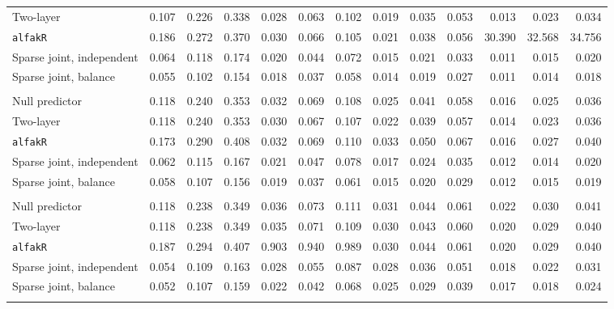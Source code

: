 \begin{center}
\begin{tabular}{l*{12}{r}}
\quad Two-layer & 0.107 & 0.226 & 0.338 & 0.028 & 0.063 & 0.102 & 0.019 & 0.035 & 0.053 & 0.013 & 0.023 & 0.034 \\
\quad \texttt{alfakR} & 0.186 & 0.272 & 0.370 & 0.030 & 0.066 & 0.105 & 0.021 & 0.038 & 0.056 & 30.390 & 32.568 & 34.756 \\
\quad Sparse joint, independent & 0.064 & 0.118 & 0.174 & 0.020 & 0.044 & 0.072 & 0.015 & 0.021 & 0.033 & 0.011 & 0.015 & 0.020 \\
\quad Sparse joint, balance & 0.055 & 0.102 & 0.154 & 0.018 & 0.037 & 0.058 & 0.014 & 0.019 & 0.027 & 0.011 & 0.014 & 0.018 \\
\addlinespace[2pt]
\multicolumn{13}{l}{\textit{500/700, 360 d}} \\
\quad Null predictor & 0.118 & 0.240 & 0.353 & 0.032 & 0.069 & 0.108 & 0.025 & 0.041 & 0.058 & 0.016 & 0.025 & 0.036 \\
\quad Two-layer & 0.118 & 0.240 & 0.353 & 0.030 & 0.067 & 0.107 & 0.022 & 0.039 & 0.057 & 0.014 & 0.023 & 0.036 \\
\quad \texttt{alfakR} & 0.173 & 0.290 & 0.408 & 0.032 & 0.069 & 0.110 & 0.033 & 0.050 & 0.067 & 0.016 & 0.027 & 0.040 \\
\quad Sparse joint, independent & 0.062 & 0.115 & 0.167 & 0.021 & 0.047 & 0.078 & 0.017 & 0.024 & 0.035 & 0.012 & 0.014 & 0.020 \\
\quad Sparse joint, balance & 0.058 & 0.107 & 0.156 & 0.019 & 0.037 & 0.061 & 0.015 & 0.020 & 0.029 & 0.012 & 0.015 & 0.019 \\
\addlinespace[2pt]
\multicolumn{13}{l}{\textit{500/700, 1080 d}} \\
\quad Null predictor & 0.118 & 0.238 & 0.349 & 0.036 & 0.073 & 0.111 & 0.031 & 0.044 & 0.061 & 0.022 & 0.030 & 0.041 \\
\quad Two-layer & 0.118 & 0.238 & 0.349 & 0.035 & 0.071 & 0.109 & 0.030 & 0.043 & 0.060 & 0.020 & 0.029 & 0.040 \\
\quad \texttt{alfakR} & 0.187 & 0.294 & 0.407 & 0.903 & 0.940 & 0.989 & 0.030 & 0.044 & 0.061 & 0.020 & 0.029 & 0.040 \\
\quad Sparse joint, independent & 0.054 & 0.109 & 0.163 & 0.028 & 0.055 & 0.087 & 0.028 & 0.036 & 0.051 & 0.018 & 0.022 & 0.031 \\
\quad Sparse joint, balance & 0.052 & 0.107 & 0.159 & 0.022 & 0.042 & 0.068 & 0.025 & 0.029 & 0.039 & 0.017 & 0.018 & 0.024 \\
\addlinespace[2pt]
\multicolumn{13}{l}{\textit{500/700, bottleneck}} \\

\end{tabular}
\end{center}
